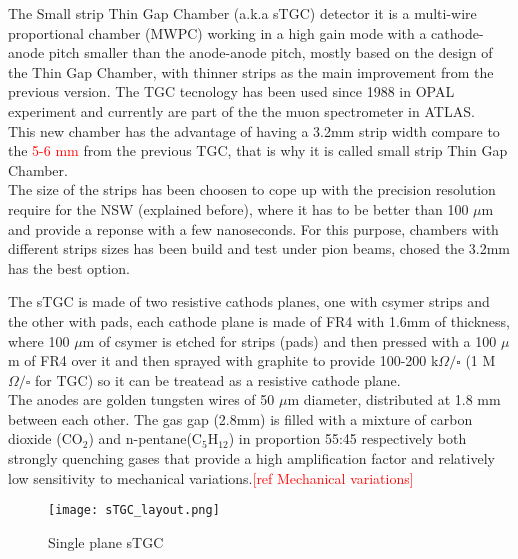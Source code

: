 The Small strip Thin Gap Chamber (a.k.a sTGC) detector it is a multi-wire proportional chamber (MWPC)  working in a high gain mode with a cathode-anode pitch
smaller than the anode-anode pitch, mostly based on the design of the Thin Gap Chamber\cite{tgc}, with thinner strips as the main improvement from the previous
version. The TGC tecnology has been used since 1988 in OPAL experiment and currently are part of the the muon spectrometer in ATLAS. \\ This new  chamber has
the advantage of having a 3.2mm strip width compare to the \textcolor{red}{5-6 mm} from the previous TGC, that is why it is called small strip Thin Gap
Chamber.\\ The size of the strips has been choosen to cope up with the precision resolution require for the NSW (explained before), where it has to be better
than 100 $\mu$m and provide a reponse with a few nanoseconds. For this purpose, chambers with different strips sizes has been build and test under pion beams,
chosed the 3.2mm has the best option\cite{stripwidth}. \par

The sTGC is made of two resistive cathods planes, one with csymer strips and the other with pads, each cathode plane is made of FR4 with 1.6mm of thickness,
where  100 $\mu$m of csymer is etched for strips (pads) and then pressed with a 100 $\mu$m of FR4 over it and then sprayed with graphite to provide 100-200
k$\Omega / \square$ (1 M$\Omega/\square$ for TGC) so it can be treatead as a resistive cathode plane.\\ The anodes are golden tungsten wires of 50 $\mu$m
diameter, distributed at 1.8 mm between each other. The gas gap (2.8mm) is filled with a mixture of carbon dioxide (CO$_2$) and n-pentane(C$_5$H$_12$) in
proportion 55:45 respectively both strongly quenching gases that provide a high amplification factor and relatively low sensitivity to mechanical
variations.\textcolor{red}{[ref Mechanical variations]}\par  



\begin{figure}[ht]
		\centering
		\texttt{[image: sTGC\_layout.png]}
		\caption{Single plane sTGC}\label{fig:sTGC}
\end{figure}

